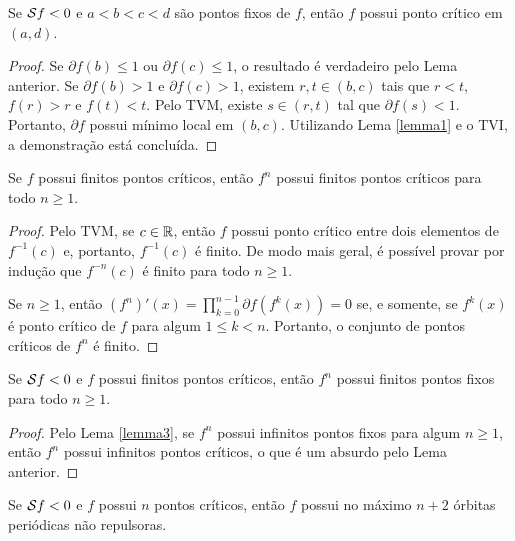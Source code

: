\begin{lemma}
\label{lemma3}
Se $\mathcal{S} f < 0$ e $a<b<c<d$ são pontos fixos de $f$, então $f$ possui ponto crítico em $(a,d)$.
\end{lemma}

\begin{proof}
Se $\partial f(b) \leq 1$ ou $\partial f(c) \leq 1$, o resultado é verdadeiro pelo Lema anterior. Se $\partial f(b) > 1$ e $\partial f(c) > 1$, existem $r, t \in (b,c)$ tais que $r<t$, $f(r) > r$ e $f(t) < t$. Pelo TVM, existe $s \in (r,t)$ tal que $\partial f(s) < 1$. Portanto, $\partial f$ possui mínimo local em $(b,c)$. Utilizando Lema \ref{lemma1} e o TVI, a demonstração está concluída.
\end{proof}

\begin{lemma}
Se $f$ possui finitos pontos críticos, então $f^n$ possui finitos pontos críticos para todo $n \geq 1$.
\end{lemma}
\begin{proof}
Pelo TVM, se $c \in \mathbb{R}$, então $f$ possui ponto crítico entre dois elementos de $f^{-1}(c)$ e, portanto, $f^{-1}(c)$ é finito.
De modo mais geral, é possível provar por indução que $f^{-n}(c)$ é finito para todo $n \geq 1$.

Se $n \geq 1$, então $(f^n)'(x) = \prod_{k=0}^{n-1} \partial f(f^k(x)) = 0$ se, e somente, se $f^k(x)$ é ponto crítico de $f$ para algum $1 \leq k < n$.
Portanto, o conjunto de pontos críticos de $f^n$ é finito.
\end{proof}

\begin{lemma}
Se $\mathcal{S} f < 0$ e $f$ possui finitos pontos críticos, então $f^n$ possui finitos pontos fixos para todo $n \geq 1$.
\end{lemma}

\begin{proof}
Pelo Lema \ref{lemma3}, se $f^n$ possui infinitos pontos fixos para algum $n \geq 1$, então $f^n$ possui infinitos pontos críticos, o que é um absurdo pelo Lema anterior.
\end{proof}

\begin{theorem}[Singer]
Se $\mathcal{S} f < 0$ e $f$ possui $n$ pontos críticos, então $f$ possui no máximo $n+2$ órbitas periódicas não repulsoras.
\end{theorem}

